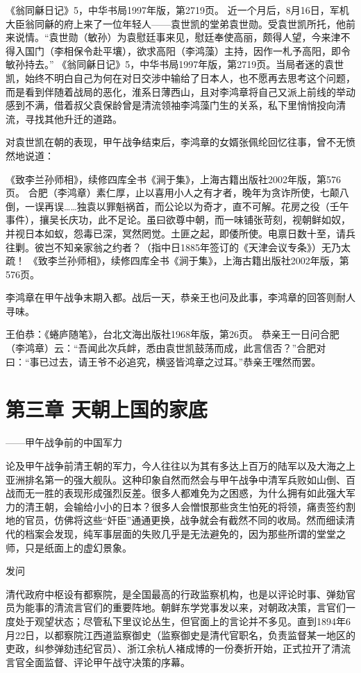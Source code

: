 \documentclass[12pt,UTF8]{ctexbook}
\begin{document}
《翁同龢日记》5，中华书局1997年版，第2719页。
近一个月后，8月16日，军机大臣翁同龢的府上来了一位年轻人——袁世凯的堂弟袁世勋。受袁世凯所托，他前来说情。“袁世勋（敏孙）为袁慰廷事来见，慰廷奉使高丽，颇得人望，今来津不得入国门（李相保令赴平壤），欲求高阳（李鸿藻）主持，因作一札予高阳，即令敏孙持去。” 《翁同龢日记》5，中华书局1997年版，第2719页。当局者迷的袁世凯，始终不明白自己为何在对日交涉中输给了日本人，也不愿再去思考这个问题，而是看到伴随着战局的恶化，淮系日薄西山，且对李鸿章将自己又派上前线的举动感到不满，借着叔父袁保龄曾是清流领袖李鸿藻门生的关系，私下里悄悄投向清流，寻找其他升迁的道路。

对袁世凯在朝的表现，甲午战争结束后，李鸿章的女婿张佩纶回忆往事，曾不无愤然地说道：

《致李兰孙师相》，续修四库全书《涧于集》，上海古籍出版社2002年版，第576页。
合肥（李鸿章）素仁厚，止以喜用小人之有才者，晚年为贪诈所使，七颠八倒，一误再误……独袁以罪魁祸首，而公论以为奇才，直不可解。花房之役（壬午事件），攘吴长庆功，此不足论。虽曰欲尊中朝，而一味铺张苛刻，视朝鲜如奴，并视日本如蚁，怨毒已深，冥然罔觉。土匪之起，即倭所使。电禀日数十至，请兵往剿。彼岂不知亲家翁之约者？（指中日1885年签订的《天津会议专条》）无乃太疏！ 《致李兰孙师相》，续修四库全书《涧于集》，上海古籍出版社2002年版，第576页。

李鸿章在甲午战争末期入都。战后一天，恭亲王也问及此事，李鸿章的回答则耐人寻味。

王伯恭：《蜷庐随笔》，台北文海出版社1968年版，第26页。
恭亲王一日问合肥（李鸿章）云：“吾闻此次兵衅，悉由袁世凯鼓荡而成，此言信否？”合肥对曰：“事已过去，请王爷不必追究，横竖皆鸿章之过耳。”恭亲王嘿然而罢。 

\chapter{第三章 天朝上国的家底}

——甲午战争前的中国军力

论及甲午战争前清王朝的军力，今人往往以为其有多达上百万的陆军以及大海之上亚洲排名第一的强大舰队。这种印象自然而然会与甲午战争中清军兵败如山倒、百战而无一胜的表现形成强烈反差。很多人都难免为之困惑，为什么拥有如此强大军力的清王朝，会输给小小的日本？很多人会憎恨那些贪生怕死的将领，痛责签约割地的官员，仿佛将这些“奸臣”通通更换，战争就会有截然不同的收局。然而细读清代的档案会发现，纯军事层面的失败几乎是无法避免的，因为那些所谓的堂堂之师，只是纸面上的虚幻景象。

发问

清代政府中枢设有都察院，是全国最高的行政监察机构，也是以评论时事、弹劾官员为能事的清流言官们的重要阵地。朝鲜东学党事发以来，对朝政决策，言官们一度处于观望状态；尽管私下里议论丛生，但官面上的言论并不多见。直到1894年6月22日，以都察院江西道监察御史（监察御史是清代官职名，负责监督某一地区的吏政，纠参弹劾违纪官员）、浙江余杭人褚成博的一份奏折开始，正式拉开了清流言官全面监督、评论甲午战守决策的序幕。
\end{document}
